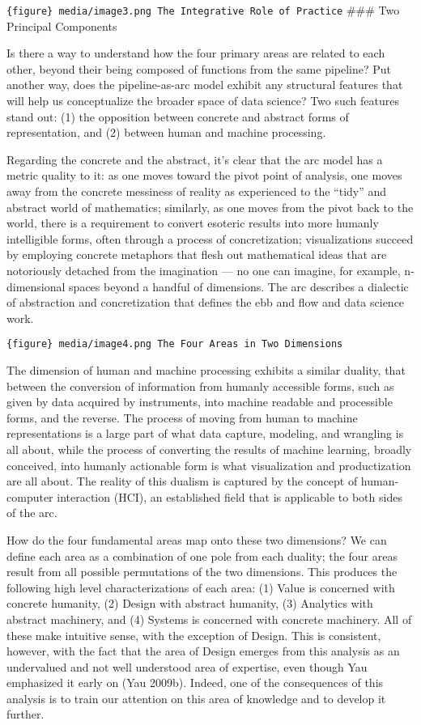 \documentclass[
  letterpaper,
  DIV=11,
  numbers=noendperiod]{scrreprt}
\begin{document}
\texttt{\{figure\}\ media/image3.png\ The\ Integrative\ Role\ of\ Practice}
\#\#\# Two Principal Components

Is there a way to understand how the four primary areas are related to
each other, beyond their being composed of functions from the same
pipeline? Put another way, does the pipeline-as-arc model exhibit any
structural features that will help us conceptualize the broader space of
data science? Two such features stand out: (1) the opposition between
concrete and abstract forms of representation, and (2) between human and
machine processing.

Regarding the concrete and the abstract, it's clear that the arc model
has a metric quality to it: as one moves toward the pivot point of
analysis, one moves away from the concrete messiness of reality as
experienced to the ``tidy'' and abstract world of mathematics;
similarly, as one moves from the pivot back to the world, there is a
requirement to convert esoteric results into more humanly intelligible
forms, often through a process of concretization; visualizations succeed
by employing concrete metaphors that flesh out mathematical ideas that
are notoriously detached from the imagination --- no one can imagine,
for example, n-dimensional spaces beyond a handful of dimensions. The
arc describes a dialectic of abstraction and concretization that defines
the ebb and flow and data science work.

\texttt{\{figure\}\ media/image4.png\ The\ Four\ Areas\ in\ Two\ Dimensions}

The dimension of human and machine processing exhibits a similar
duality, that between the conversion of information from humanly
accessible forms, such as given by data acquired by instruments, into
machine readable and processible forms, and the reverse. The process of
moving from human to machine representations is a large part of what
data capture, modeling, and wrangling is all about, while the process of
converting the results of machine learning, broadly conceived, into
humanly actionable form is what visualization and productization are all
about. The reality of this dualism is captured by the concept of
human-computer interaction (HCI), an established field that is
applicable to both sides of the arc.

How do the four fundamental areas map onto these two dimensions? We can
define each area as a combination of one pole from each duality; the
four areas result from all possible permutations of the two dimensions.
This produces the following high level characterizations of each area:
(1) Value is concerned with concrete humanity, (2) Design with abstract
humanity, (3) Analytics with abstract machinery, and (4) Systems is
concerned with concrete machinery. All of these make intuitive sense,
with the exception of Design. This is consistent, however, with the fact
that the area of Design emerges from this analysis as an undervalued and
not well understood area of expertise, even though Yau emphasized it
early on (Yau 2009b). Indeed, one of the consequences of this analysis
is to train our attention on this area of knowledge and to develop it
further.
\end{document}
